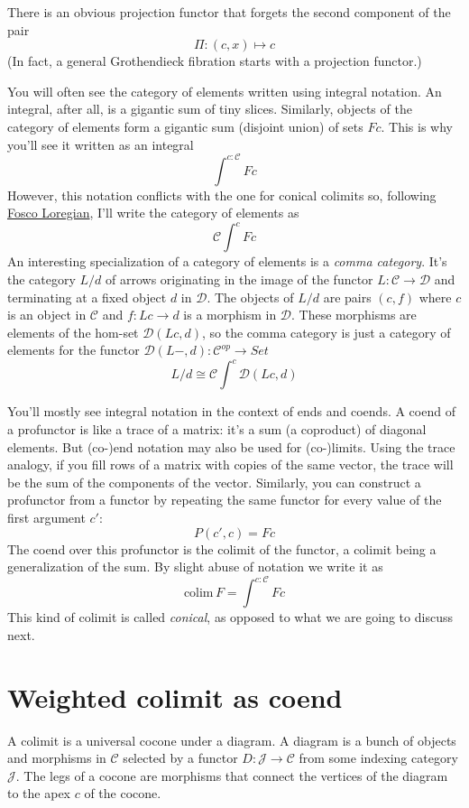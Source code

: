 \documentclass[11pt]{amsart}
\begin{document}
There is an obvious projection functor that forgets the second component of the pair
\[\Pi \colon (c, x) \mapsto c\]
(In fact, a general Grothendieck fibration starts with a projection functor.)

You will often see the category of elements written using integral notation. An integral, after all, is a gigantic sum of tiny slices. Similarly, objects of the category of elements form a gigantic sum (disjoint union) of sets $F c$. This is why you'll see it written as an integral
\[\int^{c \colon \mathcal{C}} F c\]
However, this notation conflicts with the one for conical colimits so, following \href{https://arxiv.org/abs/1501.02503}{Fosco Loregian}, I'll write the category of elements as
\[\mathcal{C}\int^{c} F c\]
An interesting specialization of a category of elements is a \emph{comma category}. It's the category $L/d$ of arrows originating in the image of the functor $L \colon \mathcal{C} \to \mathcal{D}$ and terminating at a fixed object $d$ in $\mathcal{D}$. The objects of $L/d$ are pairs $(c, f)$ where $c$ is an object in $\mathcal{C}$ and $f \colon L c \to d$ is a morphism in $\mathcal{D}$. These morphisms are elements of the hom-set $\mathcal{D}(L c , d)$, so the comma category is just a category of elements for the functor $\mathcal{D}(L-, d) \colon \mathcal{C}^{op} \to Set$
\[L/d \cong \mathcal{C}\int^{c} \mathcal{D}(L c, d)\]

You'll mostly see integral notation in the context of ends and coends. A coend of a profunctor is like a trace of a matrix: it's a sum (a coproduct) of diagonal elements. But (co-)end notation may also be used for (co-)limits. Using the trace analogy, if you fill rows of a matrix with copies of the same vector, the trace will be the sum of the components of the vector. Similarly, you can construct a profunctor from a functor by repeating the same functor for every value of the first argument $c'$:
\[ P(c', c) = F c\]
The coend over this profunctor is the colimit of the functor, a colimit being a generalization of the sum. By slight abuse of notation we write it as
\[ \mbox{colim}\, F = \int^{c \colon \mathcal{C}} F c \]
This kind of colimit is called \emph{conical}, as opposed to what we are going to discuss next.
\section{Weighted colimit as coend}
A colimit is a universal cocone under a diagram. A diagram is a bunch of objects and morphisms in $\mathcal{C}$ selected by a functor $D \colon \mathcal{J} \to \mathcal{C}$ from some indexing category $\mathcal{J}$. The legs of a cocone are morphisms that connect the vertices of the diagram to the apex $c$ of the cocone. 
\end{document}
